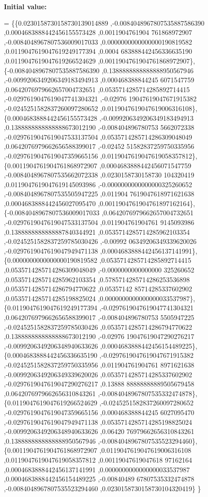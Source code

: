 {\bfseries Initial value\+:}
\begin{DoxyCode}
= \{\{0.0230158730158730139014889 ,-0.0084048967807535887586390 ,0.0004683888442456155573428 ,0.0011904761904
      761868972907 ,-0.0084048967807536009017033 ,0.0000000000000000190819582 ,0.0119047619047619249177394 ,0.0004
      683888442456336635190 ,0.0119047619047619266524629 ,0.0011904761904761868972907\},
\{-0.0084048967807535887586390 ,0.1388888888888888950567946 ,-0.0099206349206349183494913 ,0.000468388844245
      6071547759 ,0.0642076979662657004732651 ,0.0535714285714285892714415 ,-0.0297619047619047741304321 ,-0.02976
      19047619047671915382 ,-0.0245251582837260097280652 ,0.0119047619047619006316108\},
\{0.0004683888442456155573428 ,-0.0099206349206349183494913 ,0.1388888888888888673012190 ,-0.008404896780753
      5662072338 ,-0.0297619047619047533137504 ,0.0535714285714286309048049 ,0.0642076979662656588399017 ,-0.02452
      51582837259750335956 ,-0.0297619047619047359665156 ,0.0119047619047619058357812\},
\{0.0011904761904761868972907 ,0.0004683888442456071547759 ,-0.0084048967807535662072338 ,0.0230158730158730
      104320419 ,0.0119047619047619145093986 ,-0.0000000000000000325260652 ,-0.0084048967807535505947225 ,0.011904
      7619047618971621638 ,0.0004683888442456027095470 ,0.0011904761904761897162164\},
\{-0.0084048967807536009017033 ,0.0642076979662657004732651 ,-0.0297619047619047533137504 ,0.011904761904761
      9145093986 ,0.1388888888888887840344921 ,0.0535714285714285962103354 ,-0.0245251582837259785030426 ,-0.00992
      06349206349339620026 ,-0.0297619047619047949471138 ,0.0004683888442456137141991\},
\{0.0000000000000000190819582 ,0.0535714285714285892714415 ,0.0535714285714286309048049 ,-0.0000000000000000
      325260652 ,0.0535714285714285962103354 ,0.5785714285714286253536898 ,0.0535714285714286794770622 ,0.05357142
      85714285337602902 ,0.0535714285714285198825024 ,0.0000000000000000033537987\},
\{0.0119047619047619249177394 ,-0.0297619047619047741304321 ,0.0642076979662656588399017 ,-0.008404896780753
      5505947225 ,-0.0245251582837259785030426 ,0.0535714285714286794770622 ,0.1388888888888888673012190 ,-0.02976
      19047619047290276217 ,-0.0099206349206348940633626 ,0.0004683888442456154489225\},
\{0.0004683888442456336635190 ,-0.0297619047619047671915382 ,-0.0245251582837259750335956 ,0.011904761904761
      8971621638 ,-0.0099206349206349339620026 ,0.0535714285714285337602902 ,-0.0297619047619047290276217 ,0.13888
      88888888889505679458 ,0.0642076979662656310843261 ,-0.0084048967807535332474878\},
\{0.0119047619047619266524629 ,-0.0245251582837260097280652 ,-0.0297619047619047359665156 ,0.000468388844245
      6027095470 ,-0.0297619047619047949471138 ,0.0535714285714285198825024 ,-0.0099206349206348940633626 ,0.06420
      76979662656310843261 ,0.1388888888888888950567946 ,-0.0084048967807535523294460\},
\{0.0011904761904761868972907 ,0.0119047619047619006316108 ,0.0119047619047619058357812 ,0.00119047619047618
      97162164 ,0.0004683888442456137141991 ,0.0000000000000000033537987 ,0.0004683888442456154489225 ,-0.00840489
      67807535332474878 ,-0.0084048967807535523294460 ,0.0230158730158730104320419\}
\}
\end{DoxyCode}
